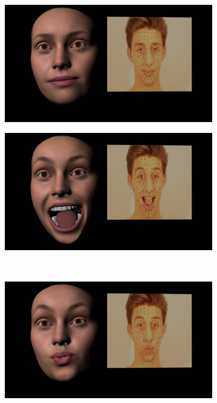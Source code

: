 \begin{figure}
        \centering
        \begin{subfigure}[t]{0.43\textwidth}
                \includegraphics[width=\textwidth]{img/results/Emily_Maya_clean_video_300}
        \end{subfigure}
        \begin{subfigure}[t]{0.43\textwidth}
                \includegraphics[width=\textwidth]{img/results/Emily_Maya_clean_video_1187}
        \end{subfigure}\\
        \begin{subfigure}[t]{0.43\textwidth}
                \includegraphics[width=\textwidth]{img/results/Emily_Maya_clean_video_1544}

\end{subfigure}
\end{figure}
